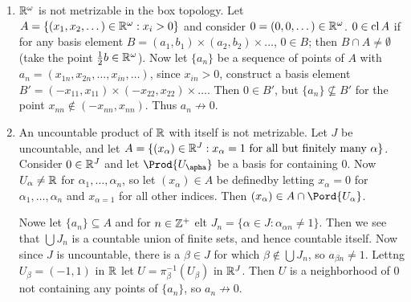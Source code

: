 \begin{example}
    \begin{enumerate}[label=(\arabic*)]
        \item $\mathbb{R}^{\omega}$ is not metrizable in the box topology. Let $A=\{(x_1,x_2,\dots) \in
            \mathbb{R}^{\omega}:x_i>0\}$ and consider $0=(0,0,\dots) \in \mathbb{R}^{\omega}$. $0 \in \operatorname{cl}{A}$ if
            for any basis element $B=(a_1,b_1) \times (a_2,b_2) \times \dots$, $0 \in B$; then  $B
            \cap A \neq \emptyset$  (take the point $ \frac{1}{2}b \in \mathbb{R}^\omega$). Now let
            $\{a_n\}$ be a sequence of points of $A$ with  $a_n=(x_{1n},x_{2n}, \dots, x_ {in},
            \dots)$, since $x_{in}>0$, construct a basis element $B'=(-x_{11},x_{11}) \times
            (-x_{22},x_{22}) \times \dots$. Then $0 \in B'$, but  $\{a_n\} \not\subseteq B'$ for the
            point $x_{nn} \notin (-x_{nn},x_{nn})$. Thus $a_n \not\rightarrow 0$.

        \item An uncountable product of  $\mathbb{R}$ with itself is not metrizable. Let  $J$ be
            uncountable, and let  $A=\{(x_{\alpha}) \in \mathbb{R}^J:x_{\alpha}=1 \text{ for all but
            finitely many } \alpha\}$. Consider $0 \in \mathbb{R}^J$ and let  $\Prod{U_{\apha}}$ be a basis
            for containing $0$. Now  $U_{\alpha} \neq \mathbb{R}$ for $\alpha_1, \dots, \alpha_n$, so let
            $(x_{\alpha}) \in A$ be definedby letting $x_{\alpha}=0$ for $\alpha_1, \dots, \alpha_n$
            and $x_{\alpha=1}$ for all other indices. Then $(x_{\alpha}) \in A \cap
            \Pord{U_{\alpha}}$.

            Nowe let $\{a_n\} \subseteq A$ and for $n \in \mathbb{Z}^+$ elt  $J_n=\{\alpha \in J:
            \alpha_{\alpha n} \neq 1\}$. Then we see that $\bigcup{J_n}$ is a countable union of
            finite sets, and hence countable itself. Now since $J$ is uncountable, there is a
            $\beta \in J$ for which  $\beta \notin \bigcup{J_n}$, so $a_{\beta n} \neq 1$. Lettng
            $U_{\beta}=(-1,1)$ in $\mathbb{R}$ let  $U=\pi_{\beta}^{-1}(U_{\beta})$ in $\mathbb{R}^J$. Then  $U$ is
            a neighborhood of  $0$ not containing  any points of  $\{a_n\}$, so $a_n \not\rightarrow
            0$.
    \end{enumerate}		
\end{example} 
